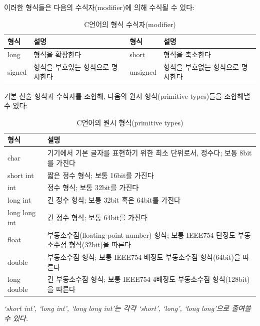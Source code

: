 \documentclass[a4paper,12pt]{book}
\begin{document}
이러한 형식들은 다음의 수식자(modifier)에 의해 수식될 수 있다:

\begin{table}[H]
    \centering

    \caption{C언어의 형식 수식자(modifier)}
    \label{Tab:type-modifier}

    \begin{tabular}{ || m{4em} | m{9.9em} || m{4em} | m{9.9em} || }
        \hline
        형식 & 설명 & 형식 & 설명\\
        \hline\hline
        long & 형식을 확장한다 & short & 형식을 축소한다 \\
        \hline
        signed & 형식을 부호있는 형식으로 명시한다 & unsigned & 형식을 부호없는 형식으로 명시한다 \\
        \hline
    \end{tabular}
\end{table}

기본 산술 형식과 수식자를 조합해, 다음의 원시 형식(primitive types)들을 조합해낼 수 있다:

\begin{table}[H]
    \centering

    \caption{C언어의 원시 형식(primitive types)}
    \label{Tab:primitive-types}

    \begin{tabular}{ || m{6em} | m{24em} || }
        \hline
        형식           & 설명 \\
        \hline\hline
        char          & 기기에서 기본 글자를 표현하기 위한 최소 단위로서, 정수다; 보통 8bit를 가진다 \\
        \hline
        \hline
        short int     & 짧은 정수 형식; 보통 16bit를 가진다 \\
        \hline
        int           & 정수 형식; 보통 32bit를 가진다 \\
        \hline
        long int      & 긴 정수 형식; 보통 32bit 혹은 64bit를 가진다 \\
        \hline
        long long int & 긴 정수 형식; 보통 64bit를 가진다 \\
        \hline
        \hline
        float         & 부동소수점(floating-point number) 형식; 보통 IEEE754 단정도 부동소수점 형식(32bit)을 따른다 \\
        \hline
        double        & 부동소수점 형식; 보통 IEEE754 배정도 부동소수점 형식(64bit)을 따른다 \\
        \hline
        long double   & 긴 부동소수점 형식; 보통 IEEE754 4배정도 부동소수점 형식(128bit)을 따른다 \\
        \hline
    \end{tabular}
    \newline
    \textit{\color{gray} \small `short int', `long int', `long long int'는 각각
    `short', `long', `long long'으로 줄여쓸 수 있다.}
\end{table}
\end{document}
